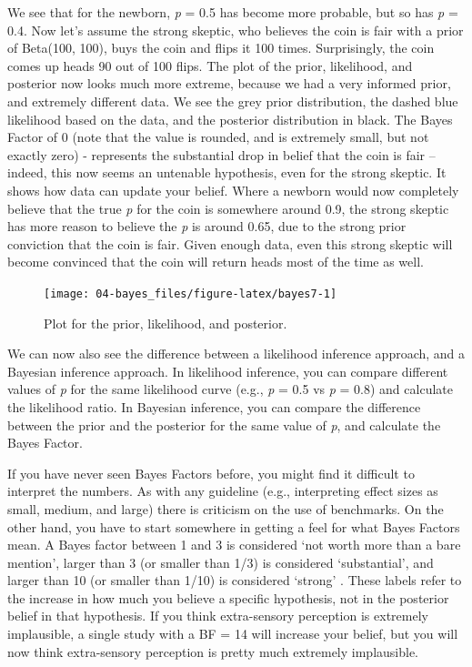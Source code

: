 \documentclass[
  oneside]{krantz}
\begin{document}
We see that for the newborn, \emph{p} = 0.5 has become more probable, but so has \emph{p} = 0.4. Now let's assume the strong skeptic, who believes the coin is fair with a prior of Beta(100, 100), buys the coin and flips it 100 times. Surprisingly, the coin comes up heads 90 out of 100 flips. The plot of the prior, likelihood, and posterior now looks much more extreme, because we had a very informed prior, and extremely different data. We see the grey prior distribution, the dashed blue likelihood based on the data, and the posterior distribution in black. The Bayes Factor of 0 (note that the value is rounded, and is extremely small, but not exactly zero) - represents the substantial drop in belief that the coin is fair -- indeed, this now seems an untenable hypothesis, even for the strong skeptic. It shows how data can update your belief. Where a newborn would now completely believe that the true \emph{p} for the coin is somewhere around 0.9, the strong skeptic has more reason to believe the \emph{p} is around 0.65, due to the strong prior conviction that the coin is fair. Given enough data, even this strong skeptic will become convinced that the coin will return heads most of the time as well.



\begin{figure}

{\centering \texttt{[image: 04-bayes\_files/figure-latex/bayes7-1]} 

}

\caption{Plot for the prior, likelihood, and posterior.}\label{fig:bayes7}
\end{figure}

We can now also see the difference between a likelihood inference approach, and a Bayesian inference approach. In likelihood inference, you can compare different values of \emph{p} for the same likelihood curve (e.g., \emph{p} = 0.5 vs \emph{p} = 0.8) and calculate the likelihood ratio. In Bayesian inference, you can compare the difference between the prior and the posterior for the same value of \emph{p}, and calculate the Bayes Factor.

If you have never seen Bayes Factors before, you might find it difficult to interpret the numbers. As with any guideline (e.g., interpreting effect sizes as small, medium, and large) there is criticism on the use of benchmarks. On the other hand, you have to start somewhere in getting a feel for what Bayes Factors mean. A Bayes factor between 1 and 3 is considered `not worth more than a bare mention', larger than 3 (or smaller than 1/3) is considered `substantial', and larger than 10 (or smaller than 1/10) is considered `strong' \citep{jeffreys_theory_1939}. These labels refer to the increase in how much you believe a specific hypothesis, not in the posterior belief in that hypothesis. If you think extra-sensory perception is extremely implausible, a single study with a BF = 14 will increase your belief, but you will now think extra-sensory perception is pretty much extremely implausible.
\end{document}
